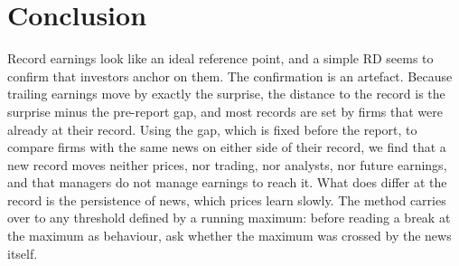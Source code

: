 \documentclass[11pt]{article}
\begin{document}
\section{Conclusion}

Record earnings look like an ideal reference point, and a simple RD seems to confirm that investors anchor on them.
The confirmation is an artefact. Because trailing earnings move by exactly the surprise, the distance to the record is
the surprise minus the pre-report gap, and most records are set by firms that were already at their record. Using the
gap, which is fixed before the report, to compare firms with the same news on either side of their record, we find
that a new record moves neither prices, nor trading, nor analysts, nor future earnings, and that managers do not
manage earnings to reach it. What does differ at the record is the persistence of news, which prices learn slowly.
The method carries over to any threshold defined by a running maximum: before reading a break at the maximum as
behaviour, ask whether the maximum was crossed by the news itself.
\end{document}
